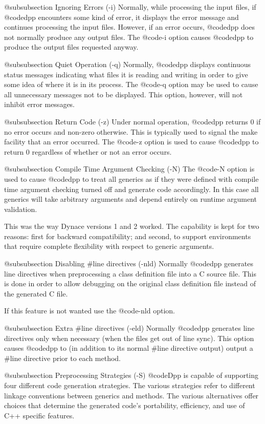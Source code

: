 @subsubsection Ignoring Errors (-i)
Normally, while processing the input files, if @code{dpp} encounters
some kind of error, it displays the error message and continues
processing the input files.  However, if an error occurs, @code{dpp}
does not normally produce any output files.  The @code{-i} option
causes @code{dpp} to produce the output files requested anyway.

@subsubsection Quiet Operation (-q)
Normally, @code{dpp} displays continuous status messages indicating
what files it is reading and writing in order to give some idea
of where it is in its process.  The @code{-q} option may be
used to cause all unnecessary messages not to be displayed.
This option, however, will not inhibit error messages.

@subsubsection Return Code (-z)
Under normal operation, @code{dpp} returns 0 if no error occurs and
non-zero otherwise.  This is typically used to signal the make
facility that an error occurred.  The @code{-z} option is used to cause
@code{dpp} to return 0 regardless of whether or not an error occurs.

@subsubsection Compile Time Argument Checking (-N)
The @code{-N} option is used to cause @code{dpp} to treat all generics
as if they were defined with compile time argument checking turned off
and generate code accordingly.  In this case all generics will take
arbitrary arguments and depend entirely on runtime argument validation.

This was the way Dynace versions 1 and 2 worked.  The capability is kept
for two reasons: first for backward compatibility; and second, to
support environments that require complete flexibility with respect to
generic arguments.

@subsubsection Disabling #line directives (-nld)
Normally @code{dpp} generates line directives when preprocessing
a class definition file into a C source file.  This is done in order
to allow debugging on the original class definition file instead
of the generated C file.

If this feature is not wanted use the @code{-nld} option.

@subsubsection Extra #line directives (-eld)
Normally @code{dpp} generates line directives only when necessary
(when the files get out of line sync).  This option causes @code{dpp}
to (in addition to its normal #line directive output) output a
#line directive prior to each method.

@subsubsection Preprocessing Strategies (-S)
@code{Dpp} is capable of supporting four different code generation
strategies.  The various strategies refer to different linkage
conventions between generics and methods.  The various alternatives
offer choices that determine the generated code's portability,
efficiency, and use of C++ specific features.

